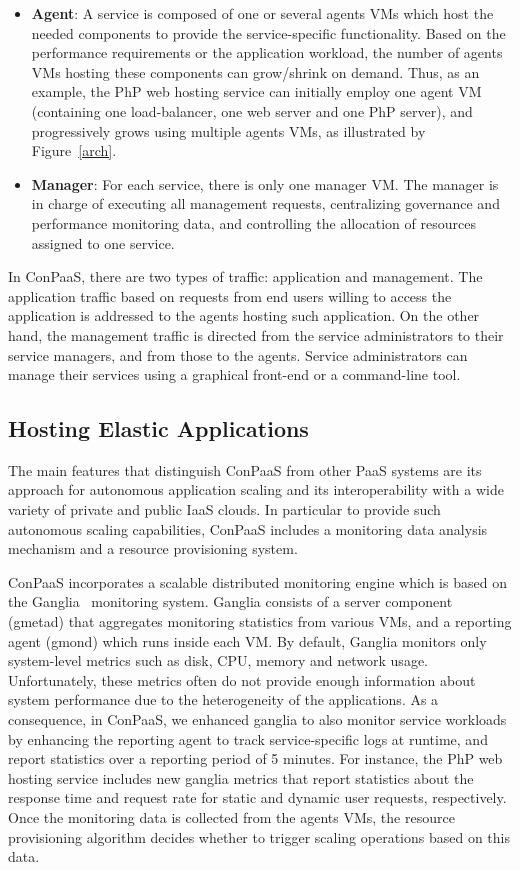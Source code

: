 \begin{itemize}
\item \textbf{Agent}: A service is composed of one or several agents VMs which host the needed components to provide the service-specific functionality. Based on the performance requirements or the application workload, the number of agents VMs hosting these components can grow/shrink on demand. Thus, as an example, the PhP web hosting service can initially employ one agent VM (containing one load-balancer, one web server and one PhP server), and progressively grows using multiple agents VMs, as illustrated by Figure~\ref{arch}. 

\item \textbf{Manager}: For each service, there is only one manager VM. The manager is in charge of executing all management requests, centralizing governance and performance monitoring data, and controlling the allocation of resources assigned to one service. 

\end{itemize}

In ConPaaS, there are two types of traffic: application and management. The application traffic based on requests from end users willing to access the application is addressed to the agents hosting such application.  On the other hand, the management traffic is directed from the service administrators to their service managers, and from those to the agents.  Service administrators can manage their services using a graphical front-end or a command-line tool.  

\subsection{Hosting Elastic Applications}

The main features that distinguish ConPaaS from other PaaS systems are its approach for autonomous application scaling and its interoperability with a wide variety of private and public IaaS clouds. In particular to provide such autonomous scaling capabilities, ConPaaS includes a monitoring data analysis mechanism  and a resource provisioning system.

ConPaaS incorporates a scalable distributed monitoring engine which is based on the Ganglia~\cite{ganglia} monitoring system. Ganglia consists of a server component (gmetad) that aggregates monitoring statistics from various VMs, and a reporting agent (gmond) which runs inside each VM. By default, Ganglia monitors only system-level metrics such as disk, CPU, memory and network usage. Unfortunately, these metrics often do not provide enough information about system performance due to the heterogeneity of the applications. As a consequence, in ConPaaS, we enhanced ganglia to also monitor service workloads by enhancing the reporting agent to track service-specific logs at runtime, and report statistics over a reporting period of 5 minutes. For instance, the PhP web hosting service includes new ganglia metrics that report statistics about the response time and request rate for static and dynamic user requests, respectively. Once the monitoring data is collected from the agents VMs, the resource provisioning  algorithm decides whether to trigger scaling operations based on this data. 

